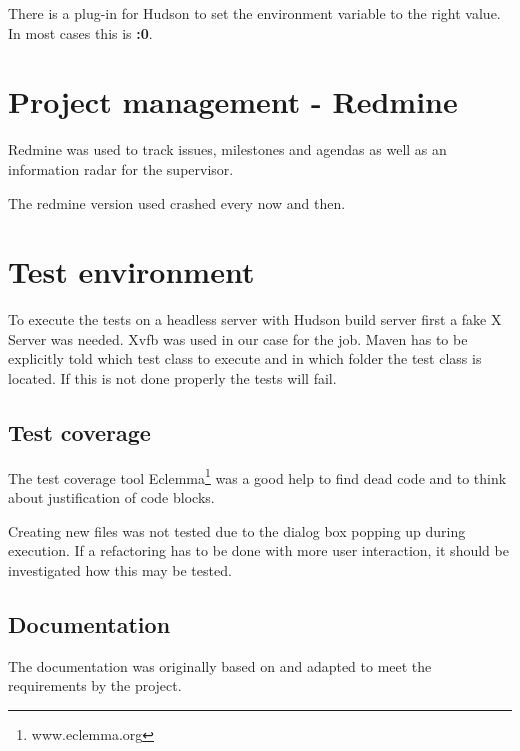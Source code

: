 There is a plug-in for Hudson to set the environment variable to
the right value. In most cases this is \textbf{:0}.

\section{Project management - Redmine}

Redmine was used to track issues, milestones and agendas as well as an 
information radar for the supervisor.

The redmine version used crashed every now and then. 

\section{Test environment}

To execute the tests on a headless server with Hudson build server first a fake
X Server was needed. Xvfb was used in our case for the job. Maven has to be
explicitly told which test class to execute and in which folder the test class
is located. If this is not done properly the tests will fail.

\subsection{Test coverage}

The test coverage tool Eclemma\footnote{www.eclemma.org} was a good help to find dead code and to think 
about justification of code blocks. 

Creating new files was not tested due to the dialog box popping up during 
execution. If a refactoring has to be done with more user interaction, it
should be investigated how this may be tested. 

\subsection{Documentation}

The documentation was originally based on \cite{AV08} and adapted to meet the 
requirements by the project.

